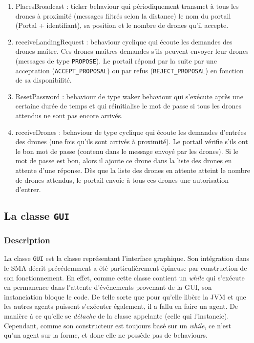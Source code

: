 \documentclass[11pt]{report}
\begin{document}
\begin{enumerate}
\item PlacesBroadcast : ticker behaviour qui périodiquement transmet à tous les drones à proximité (messages filtrés selon la distance) le nom du portail (Portal + identifiant), sa position et le nombre de drones qu'il accepte.

\item receiveLandingRequest : behaviour cyclique qui écoute les demandes des drones maître. Ces drones maîtres demandes s'ils peuvent envoyer leur drones (messages de type \verb|PROPOSE|). Le portail répond par la suite par une acceptation (\verb|ACCEPT_PROPOSAL|) ou par refus (\verb|REJECT_PROPOSAL|) en fonction de sa disponibilité.

\item ResetPassword : behaviour de type waker behaviour qui s’exécute après une certaine durée de temps et qui réinitialise le mot de passe si tous les drones attendus ne sont pas encore arrivés.

\item receiveDrones : behaviour de type cyclique qui écoute les demandes d'entrées des drones (une fois qu'ils sont arrivés à proximité). Le portail vérifie s'ils ont le bon mot de passe (contenu dans le message envoyé par les drones). Si le mot de passe est bon, alors il ajoute ce drone dans la liste des drones en attente d'une réponse. Dès que la liste des drones en attente atteint le nombre de drones attendus, le portail envoie à tous ces drones une autorisation d'entrer.
\end{enumerate}

\subsection{La classe \protect\Verb+GUI+}
\subsubsection{Description}

La classe \verb|GUI| est la classe représentant l'interface graphique. Son intégration dans le SMA décrit précédemment a été particulièrement épineuse par construction de son fonctionnement. En effet, comme cette classe contient un \textit{while} qui s'exécute en permanence dans l'attente d’événements provenant de la GUI, son instanciation bloque le code. De telle sorte que pour qu'elle libère la JVM et que les autres agents puissent s'exécuter également, il a fallu en faire un agent. De manière à ce qu'elle se \textit{détache} de la classe appelante (celle qui l'instancie). Cependant, comme son constructeur est toujours basé sur un \textit{while}, ce n'est qu'un agent sur la forme, et donc elle ne possède pas de behaviours.
\end{document}
